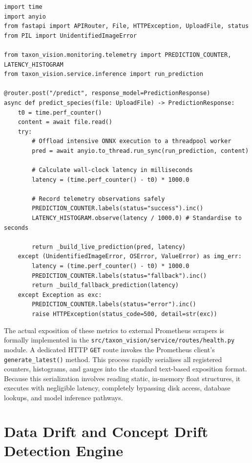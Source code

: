 \begin{listing}[ht]
\caption{Prometheus telemetry integration within the asynchronous inference router.}
\label{lst:predict_metrics}
\begin{verbatim}
import time
import anyio
from fastapi import APIRouter, File, HTTPException, UploadFile, status
from PIL import UnidentifiedImageError

from taxon_vision.monitoring.telemetry import PREDICTION_COUNTER, LATENCY_HISTOGRAM
from taxon_vision.service.inference import run_prediction

@router.post("/predict", response_model=PredictionResponse)
async def predict_species(file: UploadFile) -> PredictionResponse:
    t0 = time.perf_counter()
    content = await file.read()
    try:
        # Offload intensive ONNX execution to a threadpool worker
        pred = await anyio.to_thread.run_sync(run_prediction, content)

        # Calculate wall-clock latency in milliseconds
        latency = (time.perf_counter() - t0) * 1000.0

        # Record telemetry observations safely
        PREDICTION_COUNTER.labels(status="success").inc()
        LATENCY_HISTOGRAM.observe(latency / 1000.0) # Standardise to seconds

        return _build_live_prediction(pred, latency)
    except (UnidentifiedImageError, OSError, ValueError) as img_err:
        latency = (time.perf_counter() - t0) * 1000.0
        PREDICTION_COUNTER.labels(status="fallback").inc()
        return _build_fallback_prediction(latency)
    except Exception as exc:
        PREDICTION_COUNTER.labels(status="error").inc()
        raise HTTPException(status_code=500, detail=str(exc))
\end{verbatim}
\end{listing}

The actual exposition of these metrics to external Prometheus scrapers is formally implemented in the \texttt{src/taxon\_vision/service/routes/health.py} module. A dedicated HTTP \texttt{GET} route invokes the Prometheus client's \texttt{generate\_latest()} method. This process rapidly serialises all registered counters, histograms, and gauges into the standard text-based exposition format. Because this serialization involves reading static, in-memory float structures, it executes with negligible latency, completely bypassing disk access, database lookups, and model inference pathways.

\section{Data Drift and Concept Drift Detection Engine}
\label{sec:data_drift_engine}

